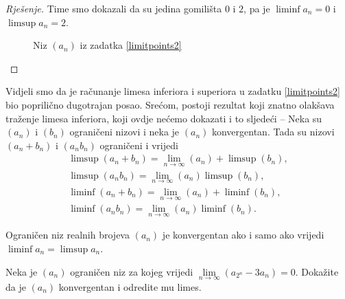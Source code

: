 \begin{proof}[Rješenje]
Time smo dokazali da su jedina gomilišta $0$ i $2$, pa je $\liminf{a_n}=0$ i $\limsup{a_n}=2$.
\begin{figure}[ht]
\begin{center}
\caption{Niz $(a_n)$ iz zadatka \ref{limitpoints2}}
\label{fig:6.1}
\end{center}
\end{figure}
\end{proof}
\begin{remark}
Vidjeli smo da je računanje limesa inferiora i superiora u zadatku \ref{limitpoints2} bio poprilično dugotrajan posao. Srećom, postoji rezultat koji znatno olakšava traženje limesa inferiora, koji ovdje nećemo dokazati i to sljedeći -- Neka su $(a_n)$ i $(b_n)$ ograničeni nizovi i neka je $(a_n)$ konvergentan. Tada su nizovi $(a_n+b_n)$ i $(a_nb_n)$ ograničeni i vrijedi
\begin{gather*}
\limsup(a_n+b_n)=\lim\limits_{n\to \infty}(a_n)+\limsup(b_n),\\
\limsup(a_nb_n)=\lim\limits_{n\to \infty}(a_n)\limsup(b_n),\\
\liminf(a_n+b_n)=\lim\limits_{n\to \infty}(a_n)+\liminf(b_n),\\
\liminf(a_nb_n)=\lim\limits_{n\to \infty}(a_n)\liminf(b_n).
\end{gather*}
\end{remark}
\begin{remark}
Ograničen niz realnih brojeva $(a_n)$ je konvergentan ako i samo ako vrijedi $\liminf{a_n}=\limsup{a_n}$.
\end{remark}
\begin{exercise}
\label{iteraaaate}
Neka je $(a_n)$ ograničen niz za kojeg vrijedi $\lim\limits_{n\to \infty}{(a_{2^n}-3a_n)}=0$. Dokažite da je $(a_n)$ konvergentan i odredite mu limes.
\end{exercise}
